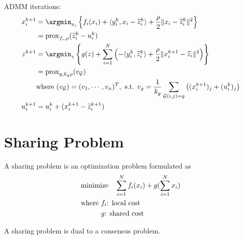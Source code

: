 ADMM iterations:
\begin{align*}
    x_i^{k+1} & = \argmin_{x_i} \left\{ f_i(x_i) + \langle y_i^k, x_i-\widetilde{z}_i^k \rangle + \dfrac{\rho}{2}\lVert x_i-\widetilde{z}_i^k \rVert^2 \right\} \\
    & = \operatorname{prox}_{f_i,\rho} (\widetilde{z}_i^{k} - u_i^{k}) \\
    z^{k+1} & = \argmin_z \left\{ g(z) + \sum\limits_{i=1}^N \left( -\langle y_i^k, \widetilde{z}_i^k \rangle + \dfrac{\rho}{2}\lVert x_i^{k+1}-\widetilde{z}_i \rVert^2 \right) \right\} \\
    & = \operatorname{prox}_{g,k_g\rho} (v_{\mathcal{G}}) \\
    & \text{where } (v_{\mathcal{G}}) = (v_1,\cdots,v_n)^T, \text{ s.t. } v_g = \dfrac{1}{k_g} \sum\limits_{\mathcal{G}(i,j)=g} \left( (x_i^{k+1})_j + (u_i^k)_j \right) \\
    u^{k+1}_i & = u_i^k + (x_i^{k+1} - \widetilde{z}^{k+1}_i)
\end{align*}

\section{Sharing Problem}

A sharing problem is an optimization problem formulated as
\begin{align*}
    & \text{minimize} \quad \sum\limits_{i=1}^N f_i(x_i) + g(\sum\limits_{i=1}^N x_i) \\
    & \text{where $f_i$: local cost} \\
    & \text{\phantom{where }$g$: shared cost}
\end{align*}

\begin{remark}
A sharing problem is dual to a consensus problem.
\end{remark}

